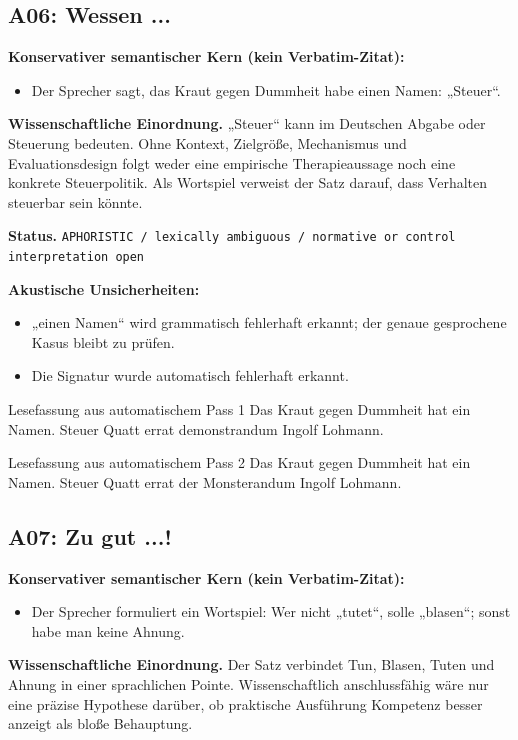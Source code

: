 \documentclass[11pt,a4paper]{article}
\newcommand{\status}[1]{\texttt{#1}}
\begin{document}
\subsection{A06: Wessen ...}
\label{sec:a06}
\textbf{Konservativer semantischer Kern (kein Verbatim-Zitat):}
\begin{itemize}
\item Der Sprecher sagt, das Kraut gegen Dummheit habe einen Namen: „Steuer“.
\end{itemize}

\textbf{Wissenschaftliche Einordnung.} „Steuer“ kann im Deutschen Abgabe oder Steuerung bedeuten. Ohne Kontext, Zielgröße, Mechanismus und Evaluationsdesign folgt weder eine empirische Therapieaussage noch eine konkrete Steuerpolitik. Als Wortspiel verweist der Satz darauf, dass Verhalten steuerbar sein könnte.

\textbf{Status.} \status{APHORISTIC / lexically ambiguous / normative or control interpretation open}

\textbf{Akustische Unsicherheiten:}
\begin{itemize}
\item „einen Namen“ wird grammatisch fehlerhaft erkannt; der genaue gesprochene Kasus bleibt zu prüfen.
\item Die Signatur wurde automatisch fehlerhaft erkannt.
\end{itemize}

\begin{asrbox}{Lesefassung aus automatischem Pass 1}
Das Kraut gegen Dummheit hat ein Namen. Steuer Quatt errat demonstrandum Ingolf Lohmann.
\end{asrbox}

\begin{asrbox}{Lesefassung aus automatischem Pass 2}
Das Kraut gegen Dummheit hat ein Namen. Steuer Quatt errat der Monsterandum Ingolf Lohmann.
\end{asrbox}


\subsection{A07: Zu gut ...!}
\label{sec:a07}
\textbf{Konservativer semantischer Kern (kein Verbatim-Zitat):}
\begin{itemize}
\item Der Sprecher formuliert ein Wortspiel: Wer nicht „tutet“, solle „blasen“; sonst habe man keine Ahnung.
\end{itemize}

\textbf{Wissenschaftliche Einordnung.} Der Satz verbindet Tun, Blasen, Tuten und Ahnung in einer sprachlichen Pointe. Wissenschaftlich anschlussfähig wäre nur eine präzise Hypothese darüber, ob praktische Ausführung Kompetenz besser anzeigt als bloße Behauptung.
\end{document}
